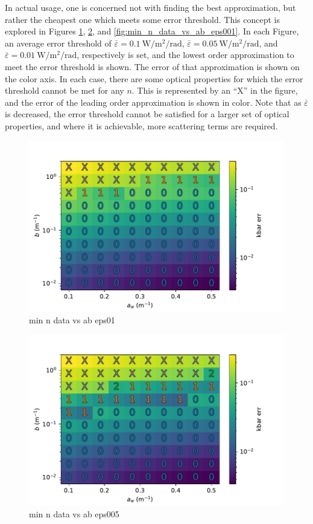 \documentclass[ms,cpyr,lof,lot]{uathesis}
\begin{document}
In actual usage, one is concerned not with finding the best approximation, but rather the cheapest one which meets some error threshold.
This concept is explored in Figures \ref{fig:min_n_data_vs_ab_eps01}, \ref{fig:min_n_data_vs_ab_eps005}, and \ref{fig:min_n_data_vs_ab_eps001}.
In each Figure, an average error threshold of $\bar{\varepsilon}=\SI{0.1}{\W\per\m\squared\per\radian}$, $\bar{\varepsilon}=\SI{0.05}{\W\per\m\squared\per\radian}$, and $\bar{\varepsilon}=\SI{0.01}{\W\per\m\squared\per\radian}$, respectively is set, and the lowest order approximation to meet the error threshold is shown.
The error of that approximation is shown on the color axis.
In each case, there are some optical properties for which the error threshold cannot be met for any $n$.
This is represented by an ``X'' in the figure, and the error of the leading order approximation is shown in color.
Note that as $\bar\varepsilon$ is decreased, the error threshold cannot be satisfied for a larger set of optical properties, and where it is achievable, more scattering terms are required.

\begin{figure}[H]
  \centering
  \includegraphics[width=\rdfigwidth]{min_n_data_vs_ab_eps01}
  \caption{min n data vs ab eps01}
  \label{fig:min_n_data_vs_ab_eps01}
\end{figure}

\begin{figure}[H]
  \centering
  \includegraphics[width=\rdfigwidth]{min_n_data_vs_ab_eps005}
  \caption{min n data vs ab eps005}
  \label{fig:min_n_data_vs_ab_eps005}
\end{figure}
\end{document}
